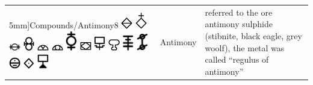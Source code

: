 \documentclass[british,final,landscape]{scrartcl}
\begin{document}
\begin{refsection}
\begin{supertabular}{p{0.3\textwidth}p{0.34\textwidth}p{0.34\textwidth}}
5mm]{Compounds/Antimony8} \includegraphics[width=5mm]{Compounds/Antimony9} \includegraphics[width=5mm]{Compounds/Antimony10} \includegraphics[width=5mm]{Compounds/Antimony11} \includegraphics[width=5mm]{Compounds/Antimony12} \includegraphics[width=5mm]{Compounds/Antimony13} \includegraphics[width=5mm]{Compounds/Antimony14} \includegraphics[width=5mm]{Compounds/Antimony15} \includegraphics[width=5mm]{Compounds/Antimony16} \includegraphics[width=5mm]{Compounds/Antimony17} \includegraphics[width=5mm]{Compounds/Antimony18} \includegraphics[width=5mm]{Compounds/Antimony19} \includegraphics[width=5mm]{Compounds/Antimony20} \includegraphics[width=5mm]{Compounds/Antimony21} \includegraphics[width=5mm]{Compounds/Antimony22} \includegraphics[width=5mm]{Compounds/Antimony23} & Antimony & referred to the ore antimony sulphide (stibnite, black eagle, grey woolf), the metal was called ``regulus of antimony'' \\

\end{supertabular}
\end{refsection}
\end{document}
